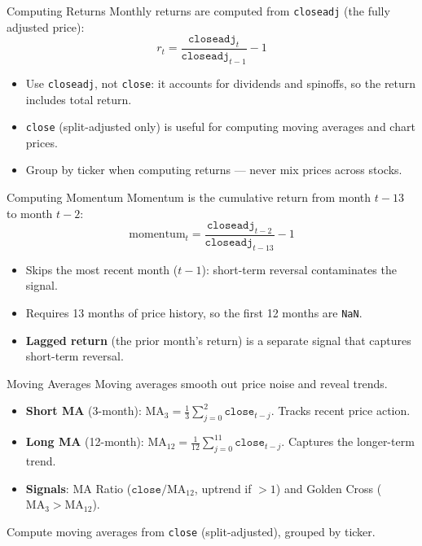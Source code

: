 \documentclass[aspectratio=169,t]{beamer}
\begin{document}
\begin{frame}{Computing Returns}
Monthly returns are computed from \texttt{closeadj} (the fully adjusted price):
\[
r_t = \frac{\texttt{closeadj}_t}{\texttt{closeadj}_{t-1}} - 1
\]

\begin{itemize}
\item Use \texttt{closeadj}, not \texttt{close}: it accounts for dividends and spinoffs, so the return includes total return.
\item \texttt{close} (split-adjusted only) is useful for computing moving averages and chart prices.
\item Group by ticker when computing returns --- never mix prices across stocks.
\end{itemize}
\end{frame}

\begin{frame}{Computing Momentum}
Momentum is the cumulative return from month $t{-}13$ to month $t{-}2$:
\[
\text{momentum}_t = \frac{\texttt{closeadj}_{t-2}}{\texttt{closeadj}_{t-13}} - 1
\]

\begin{itemize}
\item Skips the most recent month ($t{-}1$): short-term reversal contaminates the signal.
\item Requires 13 months of price history, so the first 12 months are \texttt{NaN}.
\item \textbf{Lagged return} (the prior month's return) is a separate signal that captures short-term reversal.
\end{itemize}
\end{frame}

\begin{frame}{Moving Averages}
Moving averages smooth out price noise and reveal trends.

\begin{itemize}
\item \textbf{Short MA} (3-month): $\text{MA}_3 = \frac{1}{3}\sum_{j=0}^{2} \texttt{close}_{t-j}$. Tracks recent price action.
\item \textbf{Long MA} (12-month): $\text{MA}_{12} = \frac{1}{12}\sum_{j=0}^{11} \texttt{close}_{t-j}$. Captures the longer-term trend.
\item \textbf{Signals}: MA Ratio ($\texttt{close} / \text{MA}_{12}$, uptrend if $>1$) and Golden Cross ($\text{MA}_3 > \text{MA}_{12}$).
\end{itemize}

\vspace{0.2cm}
Compute moving averages from \texttt{close} (split-adjusted), grouped by ticker.
\end{frame}
\end{document}
